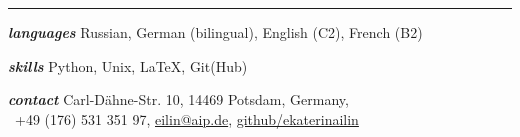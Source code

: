 \documentclass[11pt]{k-cv} %
\begin{document}
\textcolor{red}{ \rule{18cm}{1pt} }
 
\begin{entrylist}

\entry
{\large{\textit{\textbf{languages}}}}
{Russian, German (bilingual), English (C2), French (B2)}


\entry
{\large{\textit{\textbf{skills}}}}
{Python, Unix, LaTeX, Git(Hub)}


\entry
{\large{\textit{\textbf{contact}}}}
{Carl-D\"ahne-Str. 10, 14469 Potsdam, Germany,\\~+49 (176) 531 351 97, \href{mailto:eilin@aip.de}{eilin@aip.de}, \href{https://github.com/ekaterinailin}{github/ekaterinailin}}
{}{}\vspace{-1cm}
\end{entrylist}
\end{document}
